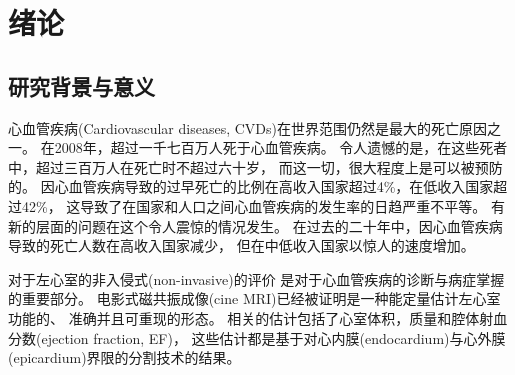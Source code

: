 
\chapter{绪论}


\section{研究背景与意义}

心血管疾病(Cardiovascular diseases, CVDs)在世界范围仍然是最大的死亡原因之一。
在2008年，超过一千七百万人死于心血管疾病。
令人遗憾的是，在这些死者中，超过三百万人在死亡时不超过六十岁，
而这一切，很大程度上是可以被预防的。
因心血管疾病导致的过早死亡的比例在高收入国家超过4\%，在低收入国家超过42\%，
这导致了在国家和人口之间心血管疾病的发生率的日趋严重不平等。
有新的层面的问题在这个令人震惊的情况发生。
在过去的二十年中，因心血管疾病导致的死亡人数在高收入国家减少，
但在中低收入国家以惊人的速度增加。

对于左心室的非入侵式(non-invasive)的评价
是对于心血管疾病的诊断与病症掌握的重要部分。
电影式磁共振成像(cine MRI)已经被证明是一种能定量估计左心室功能的、
准确并且可重现的形态。
相关的估计包括了心室体积，质量和腔体射血分数(ejection fraction, EF)，
这些估计都是基于对心内膜(endocardium)与心外膜(epicardium)界限的分割技术的结果。


